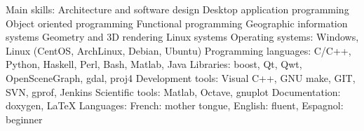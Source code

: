 \begin{cvskills}
  \cvskill
    {Main skills:}
 	{
		Architecture and software design\newline
		Desktop application programming\newline
        Object oriented programming\newline
        Functional programming\newline
        Geographic information systems\newline
        Geometry and 3D rendering\newline
        Linux systems
	}
  \cvskill
    {Operating systems:}
 	{Windows, Linux (CentOS, ArchLinux, Debian, Ubuntu)}
  \cvskill
    {Programming languages:}
 	{C/C++, Python, Haskell, Perl, Bash, Matlab, Java}
  \cvskill
    {Libraries:}
 	{boost, Qt, Qwt, OpenSceneGraph, gdal, proj4}
  \cvskill
	{Development tools:}
	{Visual C++, GNU make, GIT, SVN, gprof, Jenkins}
  \cvskill
	{Scientific tools:}
	{Matlab, Octave, gnuplot}
  \cvskill
	{Documentation:}
	{doxygen, \LaTeX}
  \cvskill
    {Languages:}
 	{
        French: mother tongue,
		English: fluent,
		Espagnol: beginner
	}
\end{cvskills}

